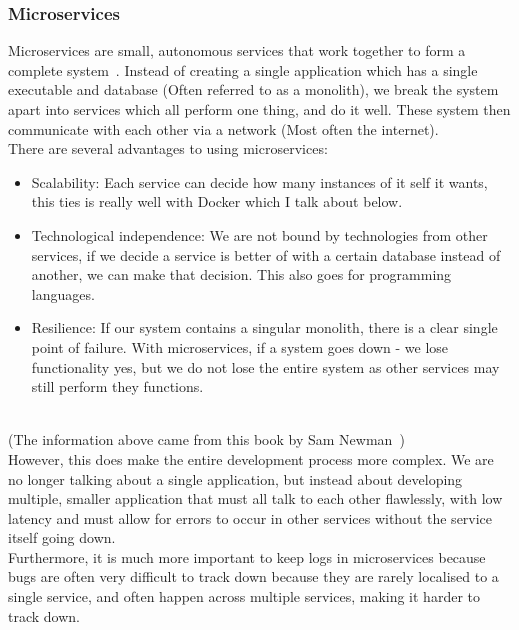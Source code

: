 \documentclass[titlepage]{article}
\begin{document}
\subsubsection{Microservices}
Microservices are small, autonomous services that work together to form a complete system~\cite{newman_2016}. Instead of creating a single application which has a single executable and database (Often referred to as a monolith), we break the system apart into services which all perform one thing, and do it well. These system then communicate with each other via a network (Most often the internet). \\

There are several advantages to using microservices:
\begin{itemize}
  \item Scalability: Each service can decide how many instances of it self it wants, this ties is really well with Docker which I talk about below.
  \item Technological independence: We are not bound by technologies from other services, if we decide a service is better of with a certain database instead of another, we can make that decision. This also goes for programming languages.
  \item Resilience: If our system contains a singular monolith, there is a clear single point of failure. With microservices, if a system goes down - we lose functionality yes, but we do not lose the entire system as other services may still perform they functions.
\end{itemize} \\

(The information above came from this book by Sam Newman~\cite{newman_2016}) \\

However, this does make the entire development process more complex. We are no longer talking about a single application, but instead about developing multiple, smaller application that must all talk to each other flawlessly, with low latency and must allow for errors to occur in other services without the service itself going down. \\

Furthermore, it is much more important to keep logs in microservices because bugs are often very difficult to track down because they are rarely localised to a single service, and often happen across multiple services, making it harder to track down. \\
\end{document}
